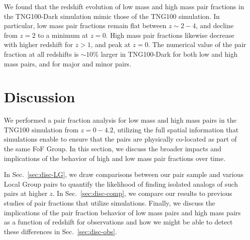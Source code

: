 \documentclass[twocolumn]{aastex631}
\begin{document}
    We found that the redshift evolution of low mass and high mass pair fractions in the TNG100-Dark simulation mimic those of the TNG100 simulation. 
    In particular, low mass pair fractions remain flat between $z\sim2-4$, and decline from $z=2$ to a minimum at $z=0$. 
    High mass pair fractions likewise decrease with higher redshift for $z>1$, and peak at $z=0$.
    The numerical value of the pair fraction at all redshifts is $\sim10\%$ larger in TNG100-Dark for both low and high mass pairs, and for major and minor pairs. 


\section{Discussion}\label{sec:discussion}
We performed a pair fraction analysis for low mass and high mass pairs in the TNG100 simulation from $z=0-4.2$, utilizing the full spatial information that simulations enable to ensure that the pairs are physically co-located as part of the same FoF Group. 
In this section, we discuss the broader impacts and implications of the behavior of high and low mass pair fractions over time.

In Sec.~\ref{sec:disc-LG}, we draw comparisons between our pair sample and various Local Group pairs to quantify the likelihood of finding isolated analogs of such pairs at higher $z$.
In Sec.~\ref{sec:disc-comp}, we compare our results to previous studies of pair fractions that utilize simulations. 
Finally, we discuss the implications of the pair fraction behavior of low mass pairs and high mass pairs as a function of redshift for observations and how we might be able to detect these differences in Sec.~\ref{sec:disc-obs}.
\end{document}
